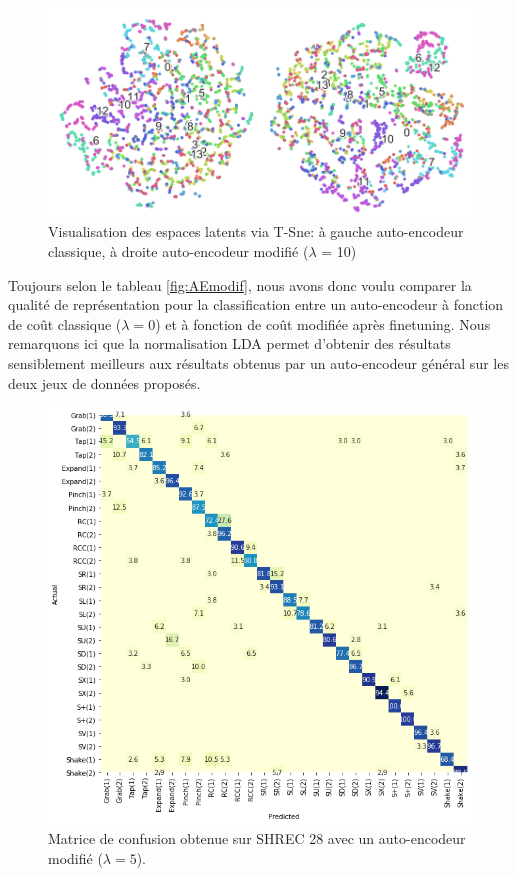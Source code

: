 \begin{figure}[H]
    \centering
    \includegraphics[width=0.8\linewidth]{Images/tsne_results.png}
    \caption{Visualisation des espaces latents via T-Sne: à gauche auto-encodeur classique, à droite auto-encodeur modifié ($\lambda$ = 10)}
    \label{fig:AEmodifTSNE}
\end{figure}

Toujours selon le tableau \ref{fig:AEmodif}, nous avons donc voulu comparer la qualité de représentation pour la classification entre un auto-encodeur à fonction de coût classique ($\lambda = 0$) et à fonction de coût modifiée après finetuning. Nous remarquons ici que la normalisation LDA permet d'obtenir des résultats sensiblement meilleurs aux résultats obtenus par un auto-encodeur général sur les deux jeux de données proposés.

\begin{figure}[H]
    \centering
    \includegraphics[width=0.8\linewidth]{Images/shrec28.png}
    \caption{Matrice de confusion obtenue sur SHREC 28 avec un auto-encodeur modifié ($\lambda = 5$).}
    \label{fig:rsshrec28}
\end{figure}\textbf{}

